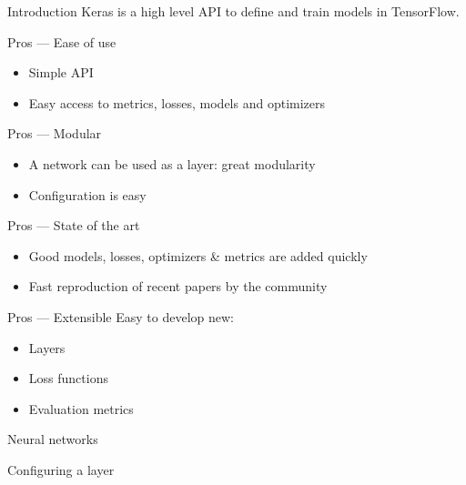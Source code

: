 \begin{frame}{Introduction}
  Keras is a high level API to define and train models in TensorFlow.

\end{frame}

\begin{frame}{Pros --- Ease of use}
  \begin{itemize}[<+->]
    \item Simple API
    \item Easy access to metrics, losses, models and optimizers
  \end{itemize}
\end{frame}

\begin{frame}{Pros --- Modular}
  \begin{itemize}[<+->]
    \item A network can be used as a layer: great modularity
    \item Configuration is easy
  \end{itemize}
\end{frame}

\begin{frame}{Pros --- State of the art}
  \begin{itemize}[<+->]
    \item Good models, losses, optimizers \& metrics are added quickly
    \item Fast reproduction of recent papers by the community
  \end{itemize}
\end{frame}

\begin{frame}{Pros --- Extensible}
  Easy to develop new:
  \begin{itemize}[<+(1)->]
    \item Layers
    \item Loss functions
    \item Evaluation metrics
  \end{itemize}
\end{frame}

\begin{frame}{Neural networks}
\end{frame}

\begin{frame}{Configuring a layer}
\end{frame}

